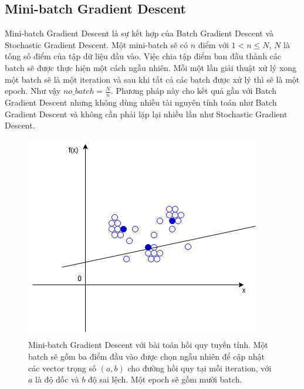\subsection{Mini-batch Gradient Descent}
Mini-batch Gradient Descent là sự kết hợp của Batch Gradient Descent và Stochastic Gradient Descent. Một mini-batch sẽ có $n$ điểm với $1<n{\leq}N$, $N$ là tống số điểm của tập dữ liệu đầu vào. Việc chia tập điểm ban đầu thành các batch sẽ được thực hiện một cách ngẫu nhiên. Mỗi một lần giải thuật xử lý xong một  batch sẽ là một iteration và sau khi tất cả các batch được xử lý thì sẽ là một epoch. Như vậy $no\_batch=\frac{N}{n}$. Phương pháp này cho kết quả gần với Batch Gradient Descent nhưng không dùng nhiều tài nguyên tính toán như Batch Gradient Descent và không cần phải lặp lại nhiều lần như Stochastic Gradient Descent.
\begin{figure}[ht!]
	\centerline{\includegraphics[scale=0.6]{images/mini_batch_gradient_descent.png}}
  	\caption{Mini-batch Gradient Descent với bài toán hồi quy tuyến tính. Một batch sẽ gồm ba điểm đầu vào được chọn ngẫu nhiên để cập nhật các vector trọng số $(a,b)$ cho đường hồi quy tại mỗi iteration, với $a$ là độ dốc và $b$ độ sai lệch. Một epoch sẽ gồm mười batch.}
  	\label{fig:mini_batch_gradient_descent}
\end{figure}
